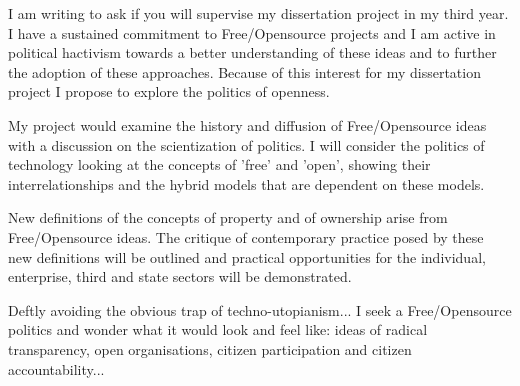 I am writing to ask if you will supervise my dissertation project in my third year. I have a sustained commitment to Free/Opensource projects and I am active in political hactivism towards a better understanding of these ideas and to further the adoption of these approaches. Because of this
interest for my dissertation project I propose to explore the politics of openness.

My project would examine the history and diffusion of Free/Opensource ideas with a discussion on the scientization of politics. I will consider the politics of technology looking at the concepts of 'free' and 'open',
showing their interrelationships and the hybrid models that are dependent on these models.

New definitions of the concepts of property and of ownership arise from Free/Opensource ideas. The critique of contemporary practice posed by these new definitions will be outlined and practical opportunities for the
individual, enterprise, third and state sectors will be demonstrated.

Deftly avoiding the obvious trap of techno-utopianism... I seek a Free/Opensource politics and wonder what it would look and feel like: ideas of radical transparency, open organisations, citizen participation
and citizen accountability...